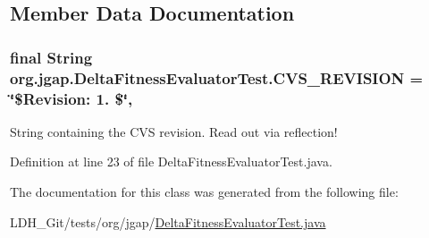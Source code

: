 \subsection{Member Data Documentation}
\hypertarget{classorg_1_1jgap_1_1_delta_fitness_evaluator_test_a1df82420a8f568df8c56444beef965b1}{
\subsubsection[{C\-V\-S\-\_\-\-R\-E\-V\-I\-S\-I\-O\-N}]{\setlength{\rightskip}{0pt plus 5cm}final String org.\-jgap.\-Delta\-Fitness\-Evaluator\-Test.\-C\-V\-S\-\_\-\-R\-E\-V\-I\-S\-I\-O\-N = \char`\"{}\$Revision\-: 1. \$\char`\"{}\hspace{0.3cm}{\ttfamily [static]}, {\ttfamily [private]}}}\label{classorg_1_1jgap_1_1_delta_fitness_evaluator_test_a1df82420a8f568df8c56444beef965b1}
String containing the C\-V\-S revision. Read out via reflection! 

Definition at line 23 of file Delta\-Fitness\-Evaluator\-Test.\-java.



The documentation for this class was generated from the following file\-:\begin{DoxyCompactItemize}
\item 
L\-D\-H\-\_\-\-Git/tests/org/jgap/\hyperlink{_delta_fitness_evaluator_test_8java}{Delta\-Fitness\-Evaluator\-Test.\-java}\end{DoxyCompactItemize}
